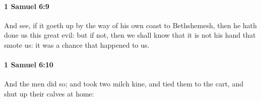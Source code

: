 		\paragraph{1 Samuel 6:9} %
			\label{1SAMUEL-6-9}

			And see, if it goeth up by the way of his own coast to Bethshemesh, then he hath done us this great evil: but if not, then we shall know that it is not his hand that smote us: it was a chance that happened to us.


		\paragraph{1 Samuel 6:10} %
			\label{1SAMUEL-6-10}

			And the men did so; and took two milch kine, and tied them to the cart, and shut up their calves at home:


